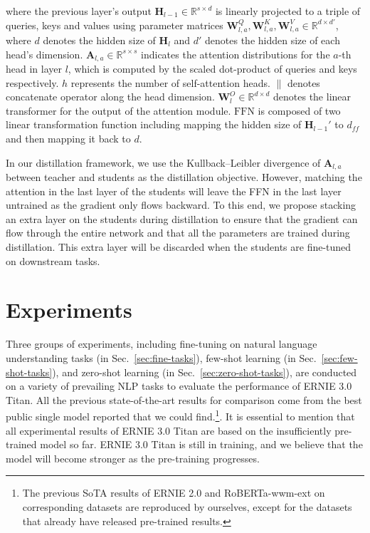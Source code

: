 where the previous layer’s output $\mathbf{H}_{l-1} \in \mathbb{R}^{ s \times d}$ is linearly projected to a triple of queries, keys and values using parameter matrices $\mathbf{W}^{Q}_{l,a}, \mathbf{W}^K_{l,a}, \mathbf{W}^{V}_{l,a} \in \mathbb{R}^{d \times d'}$, where $d$ denotes the hidden size of $\mathbf{H}_l$ and $d'$ denotes the hidden size of each head's dimension. $\mathbf{A}_{l,a} \in \mathbb{R}^{s \times s}$  indicates the attention distributions for the $a$-th head in layer $l$, which is computed by the scaled dot-product of queries and keys respectively. $h$ represents the number of self-attention heads. $ \| $ denotes concatenate operator along the head dimension. $\mathbf{W}_l^{O} \in \mathbb{R}^{d\times d}$ denotes the linear transformer for the output of the attention module. $\mathrm{FFN}$ is composed of two linear transformation function including mapping the hidden size of $\mathbf{H}_{l-1}'$ to $d_{ff}$ and then mapping it back to ${d}$.

In our distillation framework, we use the Kullback–Leibler divergence of $\mathbf{A}_{l, a}$ between teacher and students as the distillation objective. However, matching the attention in the last layer of the students will leave the FFN in the last layer untrained as the gradient only flows backward. To this end, we propose stacking an extra layer on the students during distillation to ensure that the gradient can flow through the entire network and that all the parameters are trained during distillation. This extra layer will be discarded when the students are fine-tuned on downstream tasks.

\section{Experiments}
Three groups of experiments, including fine-tuning on natural language understanding tasks (in Sec.~\ref{sec:fine-tasks}), few-shot learning (in Sec.~\ref{sec:few-shot-tasks}), and zero-shot learning (in Sec.~\ref{sec:zero-shot-tasks}), are conducted on a variety of prevailing NLP tasks to evaluate the performance of ERNIE 3.0 Titan. All the previous state-of-the-art results for comparison come from the best public single model reported that we could find.\footnote{The previous SoTA results of ERNIE 2.0 and RoBERTa-wwm-ext on corresponding datasets are reproduced by ourselves, except for the datasets that already have released pre-trained results.}. It is essential to mention that all experimental results of ERNIE 3.0 Titan are based on the insufficiently pre-trained model so far. ERNIE 3.0 Titan is still in training, and we believe that the model will become stronger as the pre-training progresses.

